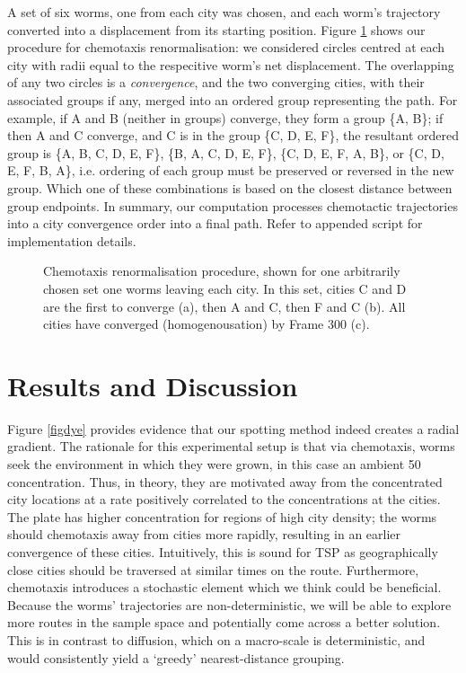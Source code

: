 \documentclass[10pt]{article}
\begin{document}
A set of six worms, one from each city was chosen, and each worm's trajectory converted into a displacement from its starting position. Figure \ref{figchem} shows our procedure for chemotaxis renormalisation: we considered circles centred at each city with radii equal to the respecitive worm's net displacement. The overlapping of any two circles is a \emph{convergence}, and the two converging cities, with their associated groups if any, merged into an ordered group representing the path. For example, if A and B (neither in groups) converge, they form a group \{A, B\}; if then A and C converge, and C is in the group \{C, D, E, F\}, the resultant ordered group is \{A, B, C, D, E, F\}, \{B, A, C, D, E, F\}, \{C, D, E, F, A, B\}, or \{C, D, E, F, B, A\}, i.e. ordering of each group must be preserved or reversed in the new group. Which one of these combinations is based on the closest distance between group endpoints. In summary, our computation processes chemotactic trajectories into a city convergence order into a final path. Refer to appended script for implementation details. 

\begin{figure}[H]
	\centering
	\caption{Chemotaxis renormalisation procedure, shown for one arbitrarily chosen set one worms leaving each city. In this set, cities C and D are the first to converge (a), then A and C, then F and C (b). All cities have converged (homogenousation) by Frame 300 (c).}
	\label{figchem}
\end{figure}


\section{Results and Discussion}

Figure \ref{figdye} provides evidence that our spotting method indeed creates a radial gradient. The rationale for this experimental setup is that via chemotaxis,  worms seek the environment in which they were grown, in this case an ambient \SI{50}{\milli \molar}  concentration. Thus, in theory, they are motivated away from the concentrated  city locations at a rate positively correlated to the concentrations at the cities. The plate has higher  concentration for regions of high city density; the worms should chemotaxis away from cities more rapidly, resulting in an earlier convergence of these cities. Intuitively, this is sound for TSP as geographically close cities should be traversed at similar times on the route. Furthermore, chemotaxis introduces a stochastic element which we think could be beneficial. Because the worms' trajectories are non-deterministic, we will be able to explore more routes in the sample space and potentially come across a better solution. This is in contrast to diffusion, which on a macro-scale is deterministic, and would consistently yield a `greedy' nearest-distance grouping. 
\end{document}
